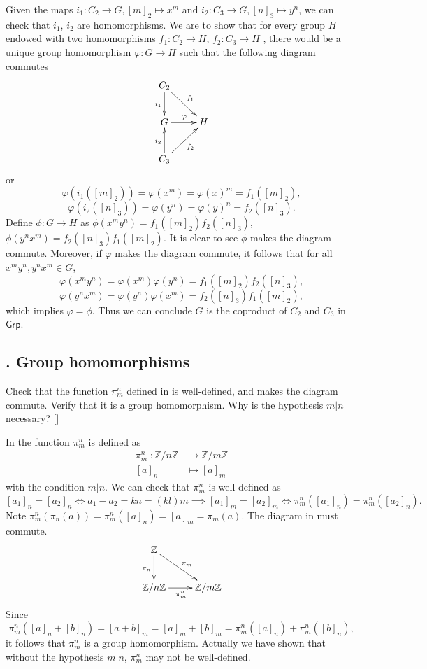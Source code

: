\documentclass[12pt,letterpaper,boxed]{hmcpset}
\newcommand{\Grp}{\mathsf{Grp}}
\begin{document}
\begin{solution}
Given the maps $i_1:C_2\rightarrow G,[m]_2\mapsto x^m$ and $i_2:C_3\rightarrow G,[n]_3\mapsto y^n$, we can check that $i_1$, $i_2$ are homomorphisms. 
We are to show that for every group $H$ endowed with two homomorphisms $f_1:C_2\rightarrow H$, $f_2:C_3\rightarrow H$ , there would be a unique group homomorphism $\varphi :G\rightarrow H$ such that the following diagram commutes
\[\xymatrix{
	C_2\ar[rd]^{f_1}\ar[d]_{i_1}  \\
	G\ar[r]^{\varphi} &  H\\
	C_3\ar[ru]_{f_2}\ar[u]^{i_2}  
}\]	
or
\[
\varphi(i_1([m]_2))=\varphi(x^m)=\varphi(x)^m=f_1([m]_2),
\]
\[
\varphi(i_2([n]_3))=\varphi(y^n)=\varphi(y)^n=f_2([n]_3).
\]
Define $\phi:G\rightarrow H$ as $\phi(x^my^n)=f_1([m]_2)f_2([n]_3)$, $\phi(y^nx^m)=f_2([n]_3)f_1([m]_2)$. It is clear to see $\phi$ makes the diagram commute. Moreover, if $\varphi$ makes the diagram commute, it follows that for all $x^my^n,y^nx^m\in G$,
\[
\varphi(x^my^n)=\varphi(x^m)\varphi(y^n)=f_1([m]_2)f_2([n]_3),
\]
\[
\varphi(y^nx^m)=\varphi(y^n)\varphi(x^m)=f_2([n]_3)f_1([m]_2),
\]
which implies $\varphi=\phi$. Thus we can conclude $G$ is the coproduct of $C_2$ and $C_3$ in $\Grp$.

\end{solution}

\subsection{. Group homomorphisms} 

\begin{problem}[4.1]
Check that the function $\pi_m^n$
defined in  is well-defined, and makes the
diagram commute. Verify that it is a group homomorphism. Why is the hypothesis
$m | n$ necessary? []
\end{problem}

\begin{solution}
In  the function $\pi_m^n$ is defined as
\[
\begin{aligned}
\pi_m^n\;: \mathbb{Z}/n\mathbb{Z} &\longrightarrow \mathbb{Z}/m\mathbb{Z}\\  
[a]_n&\longmapsto [a]_m
\end{aligned}
\]	
with the condition $m|n$. We can check that $\pi_m^n$ is well-defined as
\[
[a_1]_n=[a_2]_n\iff a_1-a_2=kn=(kl)m \implies[a_1]_m=[a_2]_m\iff\pi_m^n([a_1]_n)=\pi_m^n([a_2]_n).
\]	
Note $\pi_m^n(\pi_n(a))=\pi_m^n([a]_n)=[a]_m=\pi_m(a)$. The diagram in  must commute.
\[\xymatrix{
	\mathbb{Z}\ar[rd]^{\pi_m}\ar[d]_{\pi_n}  \\
	\mathbb{Z}/n\mathbb{Z}\ar[r]_{\pi_m^n} &  \mathbb{Z}/m\mathbb{Z} 
}\]
Since
\[
\pi_m^n([a]_n+[b]_n)=[a+b]_m=[a]_m+[b]_m=\pi_m^n([a]_n)+\pi_m^n([b]_n),
\]
it follows that $\pi_m^n$ is a group homomorphism. Actually we have shown that without the hypothesis
$m|n$, $\pi_m^n$ may not be well-defined.
\end{solution}
\end{document}
